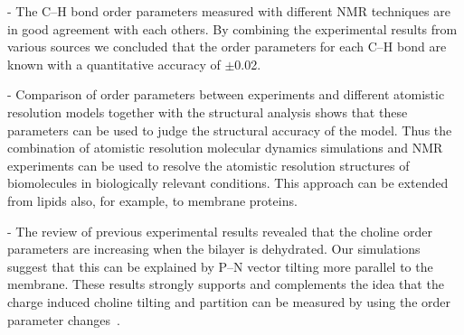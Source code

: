 \documentclass[journal=jacsat,manuscript=article]{achemso}
\begin{document}
- The C--H bond order parameters measured with different NMR techniques are in good agreement
with each others. By combining the experimental results from various sources we concluded
that the order parameters for each C--H bond are known with a quantitative accuracy of $\pm$0.02.

- Comparison of order parameters between experiments and different atomistic resolution models 
together with the structural analysis shows that these parameters can be used
to judge the structural accuracy of the model. Thus the combination of atomistic resolution 
molecular dynamics simulations and NMR experiments can be used to resolve the atomistic resolution
structures of biomolecules in biologically relevant conditions. 
This approach can be extended from lipids also, for example, to membrane proteins.


- The review of previous experimental results revealed that the 
choline order parameters are increasing when the bilayer is dehydrated. Our simulations suggest that
this can be explained by P--N vector tilting more parallel to the membrane. 
These results strongly supports and complements the idea that the charge induced choline tilting and 
partition can be measured by using the order parameter changes~\cite{ionpaper,scherer89}.

\end{document}
